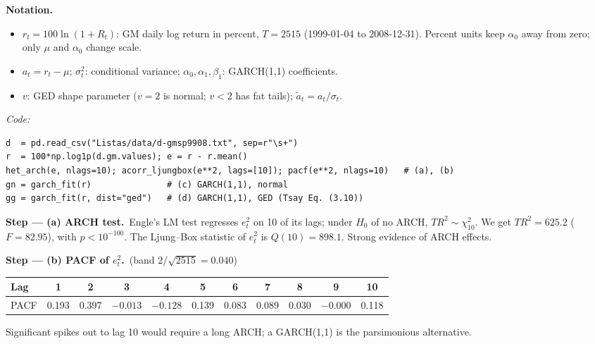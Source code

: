 \documentclass[11pt,a4paper]{article}
\newenvironment{notacao}{\par\smallskip\noindent\textbf{Notation.}\begin{itemize}[leftmargin=1.4em,topsep=1pt,itemsep=0pt]\small}{\end{itemize}}
\newcommand{\passo}[2]{\par\smallskip\noindent\textbf{Step --- #1.}~#2}
\begin{document}
\begin{sol}
\begin{notacao}
\item $r_t=100\ln(1+R_t)$: GM daily log return in percent, $T=2515$ (1999-01-04 to 2008-12-31). Percent
units keep $\alpha_0$ away from zero; only $\mu$ and $\alpha_0$ change scale.
\item $a_t=r_t-\mu$; $\sigma_t^2$: conditional variance; $\alpha_0,\alpha_1,\beta_1$: GARCH(1,1) coefficients.
\item $v$: GED shape parameter ($v=2$ is normal; $v<2$ has fat tails); $\tilde a_t=a_t/\sigma_t$.
\end{notacao}
\noindent\textit{Code:}
\begingroup\footnotesize
\begin{verbatim}
d  = pd.read_csv("Listas/data/d-gmsp9908.txt", sep=r"\s+")
r  = 100*np.log1p(d.gm.values); e = r - r.mean()
het_arch(e, nlags=10); acorr_ljungbox(e**2, lags=[10]); pacf(e**2, nlags=10)   # (a), (b)
gn = garch_fit(r)               # (c) GARCH(1,1), normal
gg = garch_fit(r, dist="ged")   # (d) GARCH(1,1), GED (Tsay Eq. (3.10))
\end{verbatim}
\endgroup

\passo{(a) ARCH test}{Engle's LM test regresses $e_t^2$ on 10 of its lags; under $H_0$ of no ARCH, $TR^2\sim\chi^2_{10}$.
We get $TR^2=625.2$ ($F=82.95$), with $p<10^{-100}$. The Ljung--Box statistic of $e_t^2$ is $Q(10)=898.1$.
Strong evidence of ARCH effects.}
\passo{(b) PACF of $e_t^2$}{(band $2/\sqrt{2515}=0.040$)}
\begin{center}\small
\begin{tabular}{lcccccccccc}
\toprule
Lag & 1 & 2 & 3 & 4 & 5 & 6 & 7 & 8 & 9 & 10\\
\midrule
PACF & 0.193 & 0.397 & $-0.013$ & $-0.128$ & 0.139 & 0.083 & 0.089 & 0.030 & $-0.000$ & 0.118\\
\bottomrule
\end{tabular}
\end{center}
Significant spikes out to lag 10 would require a long ARCH; a GARCH(1,1) is the parsimonious alternative.


\end{sol}
\end{document}
